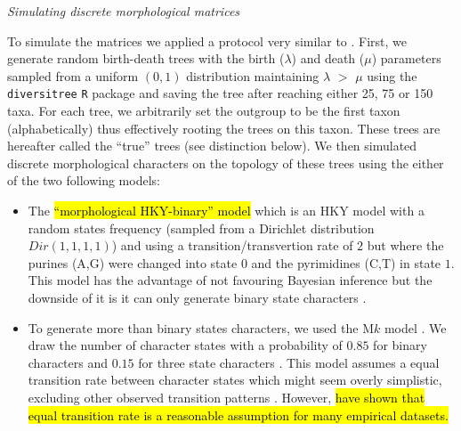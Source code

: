 \documentclass[12pt,letterpaper]{article}
\renewcommand{\subsection}[1]{%
\bigskip
\begin{center}
\begin{large}
\normalfont\itshape #1
\end{large}
\end{center}}
\begin{document}
\subsection{Simulating discrete morphological matrices}
To simulate the matrices we applied a protocol very similar to \cite{Guillerme2016146}.
First, we generate random birth-death trees with the birth ($\lambda$) and death ($\mu$) parameters sampled from a uniform $(0,1)$ distribution maintaining $\lambda$ $>$ $\mu$ using the \texttt{diversitree} \texttt{R} package \citep[v0.9-8;][]{fitzjohndiversitree2012} and saving the tree after reaching either 25, 75 or 150 taxa.
For each tree, we arbitrarily set the outgroup to be the first taxon (alphabetically) thus effectively rooting the trees on this taxon.
These trees are hereafter called the ``true'' trees (see distinction below).
We then simulated discrete morphological characters on the topology of these trees using the either of the two following models:
\begin{itemize}
    \item The \hl{``morphological HKY-binary'' model} \citep{OReilly20160081} which is an HKY model \citep{HKY85} with a random states frequency (sampled from a Dirichlet distribution $Dir(1,1,1,1)$) and using a transition/transvertion rate of $2$ \citep{douadycomparison2003} but where the purines (A,G) were changed into state $0$ and the pyrimidines (C,T) in state $1$.
    This model has the advantage of not favouring Bayesian inference \citep[since it doesn't use an M$k$ model;][; see discussion]{OReilly20160081} but the downside of it is it can only generate binary state characters \citep[or 4 states;][]{puttick2017uncertain}.
    \item To generate more than binary states characters, we used the M$k$ model \citep{lewisa2001}.
    We draw the number of character states with a probability of $0.85$ for binary characters and $0.15$ for three state characters \citep{Guillerme2016146,ZouConvergence}.
    This model assumes a equal transition rate between character states which might seem overly simplistic, excluding other observed transition patterns \citep[e.g. Dollo characters;][]{Dollo,wright2015came}.
    However, \cite{Wright01072016} \hl{have shown that equal transition rate is a reasonable assumption for many empirical datasets.}
\end{itemize}
\end{document}
